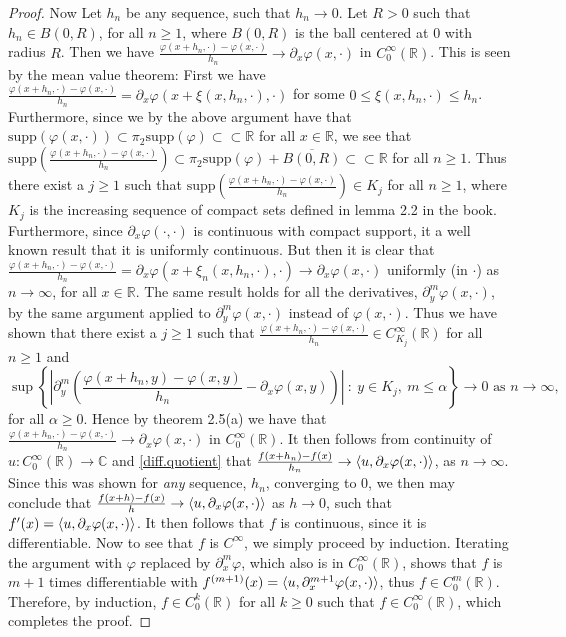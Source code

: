 \documentclass[a4paper,11pt]{article}
\newcommand{\supp}{\text{supp}}
\newcommand{\abs}[1]{\left\lvert #1 \right\rvert}
\newcommand{\R}{\mathbb{R}}
\newcommand{\C}{\mathbb{C}}
\numberwithin{equation}{section}
\begin{document}
\begin{proof}
	 Now Let $ h_n $ be any sequence, such that $ h_n\to 0 $. Let $ R>0 $ such that $ h_n\in B(0,R) $, for all $ n\geq1 $, where $ B(0,R) $ is the ball centered at $ 0 $ with radius $ R $. Then we have $ \frac{\varphi(x+h_n,\cdot)-\varphi(x,\cdot)}{h_n}\to\partial_x\varphi(x,\cdot) $ in $ C^\infty_0(\R) $. This is seen by the mean value theorem: First we have $ \frac{\varphi(x+h_n,\cdot)-\varphi(x,\cdot)}{h_n}=\partial_x\varphi(x+\xi(x,h_n,\cdot),\cdot) $ for some $ 0\leq\xi(x,h_n,\cdot)\leq h_n $. Furthermore, since we by the above argument have that $ \supp(\varphi(x,\cdot))\subset\pi_2\supp(\varphi)\subset\subset\R $ for all $ x\in\R $, we see that $ \supp\left(\frac{\varphi(x+h_n,\cdot)-\varphi(x,\cdot)}{h_n}\right)\subset\pi_2\supp(\varphi)+\overline{B(0,R)}\subset\subset \R $ for all $ n\geq1 $. Thus there exist a $ j\geq1 $ such that $\supp\left(\frac{\varphi(x+h_n,\cdot)-\varphi(x,\cdot)}{h_n}\right)\in K_j  $ for all $ n\geq1 $, where $ K_j $ is the increasing sequence of compact sets defined in lemma 2.2 in the book. Furthermore, since $ \partial_x\varphi(\cdot,\cdot) $ is continuous with compact support, it a well known result that it is uniformly continuous. But then it is clear that $ \frac{\varphi(x+h_n,\cdot)-\varphi(x,\cdot)}{h_n}=\partial_x\varphi(x+\xi_n(x,h_n,\cdot),\cdot)\to\partial_x\varphi(x,\cdot) $ uniformly (in $ \cdot $) as $ n\to\infty $, for all $ x\in \R $. The same result holds for all the derivatives, $ \partial_y^m\varphi(x,\cdot) $, by the same argument applied to $ \partial_y^m\varphi(x,\cdot) $ instead of $ \varphi(x,\cdot) $.
	 Thus we have shown that there exist a $ j\geq1 $ such that $ \frac{\varphi(x+h_n,\cdot)-\varphi(x,\cdot)}{h_n}\in C^\infty_{K_j}(\R) $ for all $ n\geq1 $ and \begin{equation}
	 \sup\left\{\abs{\partial^m_y\left(\frac{\varphi(x+h_n,y)-\varphi(x,y)}{h_n}-\partial_x\varphi(x,y)\right)}\ :\ y\in K_j,\ m\leq\alpha \right\}\to0 \text{ as }n\to\infty,
	 \end{equation}
	 for all $ \alpha\geq0 $. Hence by theorem 2.5(a) we have that $ \frac{\varphi(x+h_n,\cdot)-\varphi(x,\cdot)}{h_n}\to \partial_x\varphi(x,\cdot) $ in $ C_0^\infty(\R) $.
	 It then follows from continuity of $ u: C^\infty_0(\R)\to\C $ and \eqref{diff.quotient} that $ \frac{f(x+h_n)-f(x)}{h_n}\to\braket{u,\partial_x\varphi(x,\cdot)} $, as $ n\to\infty $. Since this was shown for \emph{any} sequence, $ h_n $, converging to $ 0 $, we then may conclude that $ \frac{f(x+h)-f(x)}{h}\to \braket{u,\partial_x\varphi(x,\cdot)}$ as $ h\to 0 $, such that $ f'(x)=\braket{u,\partial_x\varphi(x,\cdot)} $. It then follows that $ f $ is continuous, since it is differentiable. Now to see that $ f $ is $ C^\infty $, we simply proceed by induction. Iterating the argument with $ \varphi $ replaced by $ \partial^m_x\varphi $, which also is in $ C^\infty_0(\R) $, shows that $ f $ is $ m+1 $ times differentiable with $ f^{(m+1)}(x)=\braket{u,\partial^{m+1}_x\varphi(x,\cdot)} $, thus $ f\in C_0^m(\R) $. Therefore, by induction, $ f\in C^k_0(\R) $ for all $ k\geq0 $ such that $ f\in C^{\infty}_0(\R) $, which completes the proof.
\end{proof} 
\end{document}
